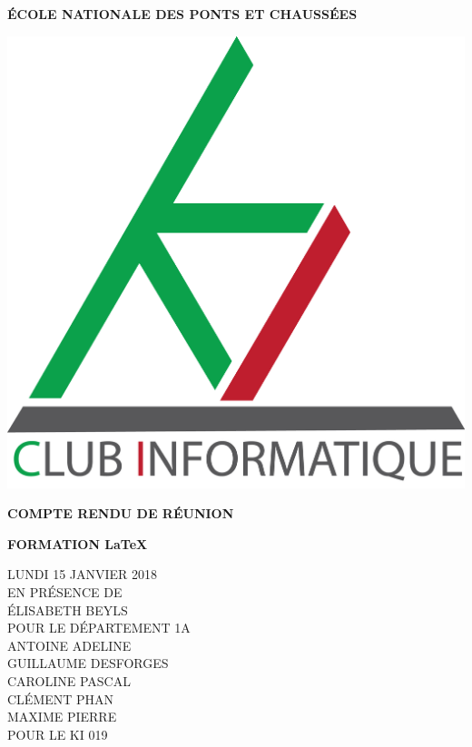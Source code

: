 \documentclass[12pt,twoside]{article}
\begin{document}
\thispagestyle{empty}
\begin{center}

{\Large{\bf ÉCOLE NATIONALE DES PONTS ET CHAUSSÉES}}

\medskip

\begin{center}
\includegraphics[scale=0.3]{Logo_fond_clair_transparent.png}
\end{center}
\vspace{1cm}
{\Large{\bf COMPTE RENDU DE RÉUNION}}

\vspace{1cm}

{\huge{\bf FORMATION \LaTeX{}}}

\vspace{1cm}

{\large{LUNDI 15 JANVIER 2018\vspace{1cm}\\EN PRÉSENCE DE\vspace{0.5cm}\\ÉLISABETH BEYLS\\POUR LE DÉPARTEMENT 1A\vspace{0.5cm}\\ANTOINE ADELINE\\GUILLAUME DESFORGES\\CAROLINE PASCAL\\CLÉMENT PHAN\\MAXIME PIERRE\\POUR LE KI 019}}


\end{center}
\end{document}
